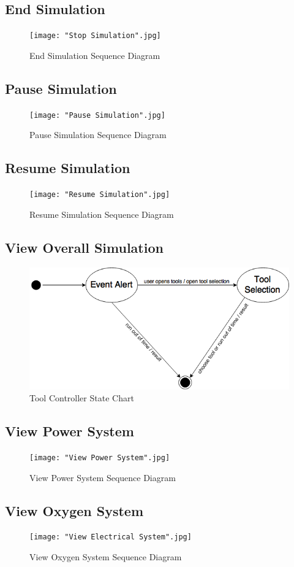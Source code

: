 \documentclass[12pt, titlepage]{article}
\begin{document}
\subsection*{End Simulation}
\begin{figure}[H]
\centering
\texttt{[image: "Stop Simulation".jpg]}
\caption{End Simulation Sequence Diagram}
\end{figure}
\subsection*{Pause Simulation}
\begin{figure}[H]
\centering
\texttt{[image: "Pause Simulation".jpg]}
\caption{Pause Simulation Sequence Diagram}
\end{figure}
\subsection*{Resume Simulation}
\begin{figure}[H]
\centering
\texttt{[image: "Resume Simulation".jpg]}
\caption{Resume Simulation Sequence Diagram}
\end{figure}
\subsection*{View Overall Simulation}
\begin{figure}[H]
\centering
\includegraphics[width=120mm]{ToolController.png}
\caption{Tool Controller State Chart}
\end{figure}
\subsection*{View Power System}
\begin{figure}[H]
\centering
\texttt{[image: "View Power System".jpg]}
\caption{View Power System Sequence Diagram}
\end{figure}
\subsection*{View Oxygen System}
\begin{figure}[H]
\centering
\texttt{[image: "View Electrical System".jpg]}
\caption{View Oxygen System Sequence Diagram}
\end{figure}
\end{document}
